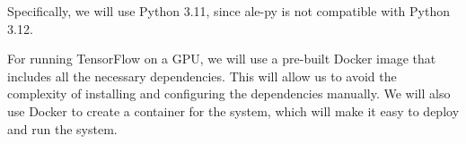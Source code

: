 Specifically, we will use Python 3.11, since ale-py is not compatible with
Python 3.12.

For running TensorFlow on a GPU, we will use a pre-built Docker image that
includes all the necessary dependencies. This will allow us to avoid the
complexity of installing and configuring the dependencies manually. We will
also use Docker to create a container for the system, which will make it easy
to deploy and run the system.